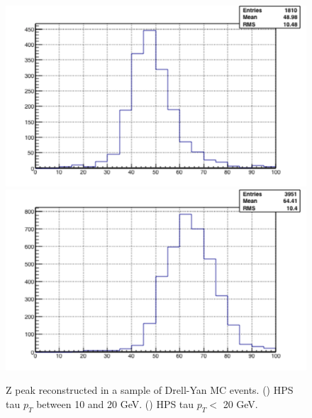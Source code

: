 \begin{figure}[hbtp]
  \begin{center}
    \includegraphics[width=\cmsFigWidth]{figures/gen_muhad_mass_1020}
    \includegraphics[width=\cmsFigWidth]{figures/gen_muhad_mass_20}
    \caption{Z peak reconstructed in a sample of Drell-Yan MC events. (\cmsLeft) HPS tau $p_T$ between 10 and 20 GeV. (\cmsRight) HPS tau $p_T <$ 20 GeV.}
    \label{fig:Zpeakstudy}
  \end{center}
\end{figure}
